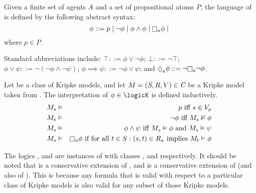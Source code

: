 
\begin{definition}
Given a finite set of agents $A$ and a set of propositional atoms $P$, the
language of \langF{} is defined by the following abstract syntax:
$$
\phi ::=    p \bnfalt
            \neg \phi \bnfalt
            \phi \land \phi \bnfalt
            \knows_a \phi \bnfalt
$$
where $p \in P$.
\end{definition}

Standard abbreviations include:
$\top ::= \phi \lor \neg \phi$;
$\bot ::= \neg \top$;
$\phi \lor \psi ::= \neg (\neg \phi \land \neg \psi)$;
$\phi \implies \psi ::= \neg \phi \lor \psi$;
and $\suspects_a \phi ::= \neg \knows_a \neg \phi$.


\begin{definition}
Let \classC{} be a class of Kripke models, and let $M = (S, R, V) \in \textit{C}$
be a Kripke model taken from \classC{}. The interpretation of $\phi \in \logicK$
is defined inductively.
\begin{eqnarray*}
M_s &\entails& p \text{ iff } s \in V_p\\
M_s &\entails& \neg \phi \text{ iff } M_s \nentails \phi\\
M_s &\entails& \phi \land \psi \text{ iff } M_s \entails \phi \text{ and } M_s
\entails \psi\\
M_s &\entails& \knows_a \phi \text{ if for all } t \in S : (s, t) \in R_a \text{
implies } M_t \entails \phi\\
\end{eqnarray*}
\end{definition}

The logics \logicK{}, \logicKD{} and \logicS{} are instances of \logicC{} with
classes \classK{}, \classKD{} and \classS{} respectively. It should be noted
that \logicKD{} is a conservative extension of \logicK{}, and \logicS{} is a
conservative extension of \logicKD{} (and also of \logicK{}). This is because
any formula that is valid with respect to a particular class of Kripke models
is also valid for any subset of those Kripke models.


